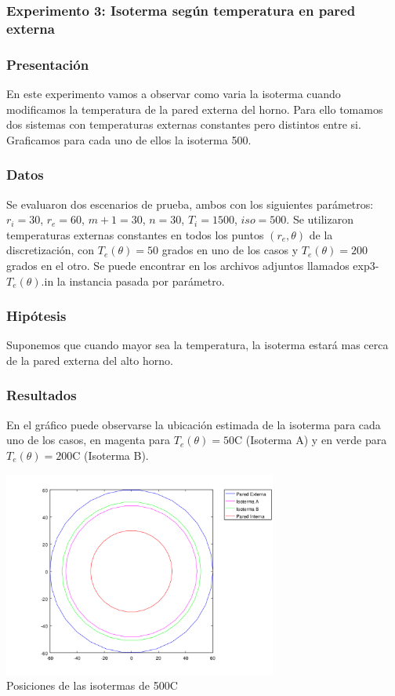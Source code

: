     \subsubsection*{Experimento 3: Isoterma según temperatura en pared externa} 
      
      \subsubsection*{Presentación}
        En este experimento vamos a observar como varia la isoterma cuando modificamos la temperatura de la pared externa del horno. Para ello tomamos dos sistemas con temperaturas externas constantes pero distintos entre si. Graficamos para cada uno de ellos la isoterma 500. 
      
      \subsubsection*{Datos}
        Se evaluaron dos escenarios de prueba, ambos con los siguientes parámetros: $r_i = 30$, $r_e = 60$, $m+1 = 30$, $n = 30$, $T_i = 1500$, $iso = 500$. Se utilizaron temperaturas externas constantes en todos los puntos $(r_e, \theta)$ de la discretización, con $T_e(\theta) = 50$ grados en uno de los casos y $T_e(\theta) = 200$ grados en el otro. Se puede encontrar en los archivos adjuntos llamados exp3-$T_e(\theta)$.in la instancia pasada por parámetro.

      \subsubsection*{Hipótesis}
        Suponemos que cuando mayor sea la temperatura, la isoterma estará mas cerca de la pared externa del alto horno. 

      \subsubsection*{Resultados}
        En el gráfico puede observarse la ubicación estimada de la isoterma para cada uno de los casos, en magenta para $T_e(\theta) = 50${\degree}C (Isoterma A) y en verde para $T_e(\theta) = 200${\degree}C (Isoterma B).
        
            \begin{center}
              \includegraphics[width=9cm]{graficos/exp3/exp3.png} \\
              {\small Posiciones de las isotermas de 500{\degree}C}
            \end{center}

